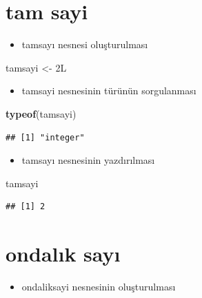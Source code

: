 \documentclass[
  oneside]{book}
\newenvironment{Shaded}{\begin{snugshade}}{\end{snugshade}}
\newcommand{\FunctionTok}[1]{\textcolor[rgb]{0.13,0.29,0.53}{\textbf{#1}}}
\newcommand{\NormalTok}[1]{#1}
\newcommand{\OtherTok}[1]{\textcolor[rgb]{0.56,0.35,0.01}{#1}}
\providecommand{\tightlist}{%
  \setlength{\itemsep}{0pt}\setlength{\parskip}{0pt}}
\begin{document}
\hypertarget{tam-sayi}{%
\section{tam sayi}\label{tam-sayi}}

\begin{itemize}
\tightlist
\item
  tamsayı nesnesi oluşturulması
\end{itemize}

\begin{Shaded}
\begin{Highlighting}[]
\NormalTok{tamsayi }\OtherTok{\textless{}{-}}\NormalTok{ 2L}
\end{Highlighting}
\end{Shaded}

\begin{itemize}
\tightlist
\item
  tamsayi nesnesinin türünün sorgulanması
\end{itemize}

\begin{Shaded}
\begin{Highlighting}[]
\FunctionTok{typeof}\NormalTok{(tamsayi)}
\end{Highlighting}
\end{Shaded}

\begin{verbatim}
## [1] "integer"
\end{verbatim}

\begin{itemize}
\tightlist
\item
  tamsayı nesnesinin yazdırılması
\end{itemize}

\begin{Shaded}
\begin{Highlighting}[]
\NormalTok{tamsayi}
\end{Highlighting}
\end{Shaded}

\begin{verbatim}
## [1] 2
\end{verbatim}

\hypertarget{ondalux131k-sayux131}{%
\section{ondalık sayı}\label{ondalux131k-sayux131}}

\begin{itemize}
\tightlist
\item
  ondaliksayi nesnesinin oluşturulması
\end{itemize}
\end{document}
